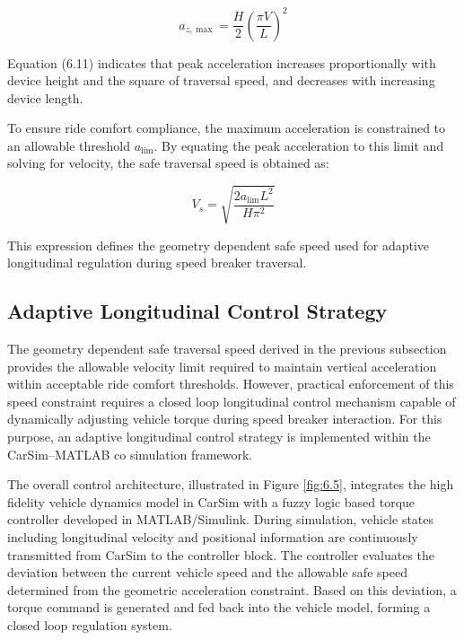 \documentclass[a4paper,12pt,one side]{report}
\theoremstyle{definition}
\begin{document}
\begin{itemize}
\begin{equation}
a_{z,\max} = \frac{H}{2}\left( \frac{\pi V}{L} \right)^{2} \tag{6.11}
\end{equation}

Equation (6.11) indicates that peak acceleration increases proportionally with device height and the square of traversal speed, and decreases with increasing device length.

To ensure ride comfort compliance, the maximum acceleration is constrained to an allowable threshold $a_{\lim}$. By equating the peak acceleration to this limit and solving for velocity, the safe traversal speed is obtained as:

\begin{equation}
V_{s} = \sqrt{\frac{2a_{\lim}L^{2}}{H\pi^{2}}} \tag{6.12}
\end{equation}

This expression defines the geometry dependent safe speed used for adaptive longitudinal regulation during speed breaker traversal.

\subsection{Adaptive Longitudinal Control Strategy}

The geometry dependent safe traversal speed derived in the previous subsection provides the allowable velocity limit required to maintain vertical acceleration within acceptable ride comfort thresholds. However, practical enforcement of this speed constraint requires a closed loop longitudinal control mechanism capable of dynamically adjusting vehicle torque during speed breaker interaction. For this purpose, an adaptive longitudinal control strategy is implemented within the CarSim--MATLAB co simulation framework.

The overall control architecture, illustrated in Figure \ref{fig:6.5}, integrates the high fidelity vehicle dynamics model in CarSim with a fuzzy logic \cite{zadeh1988fuzzy} based torque controller developed in MATLAB/Simulink. During simulation, vehicle states including longitudinal velocity and positional information are continuously transmitted from CarSim to the controller block. The controller evaluates the deviation between the current vehicle speed and the allowable safe speed determined from the geometric acceleration constraint. Based on this deviation, a torque command is generated and fed back into the vehicle model, forming a closed loop regulation system.


\end{itemize}
\end{document}

